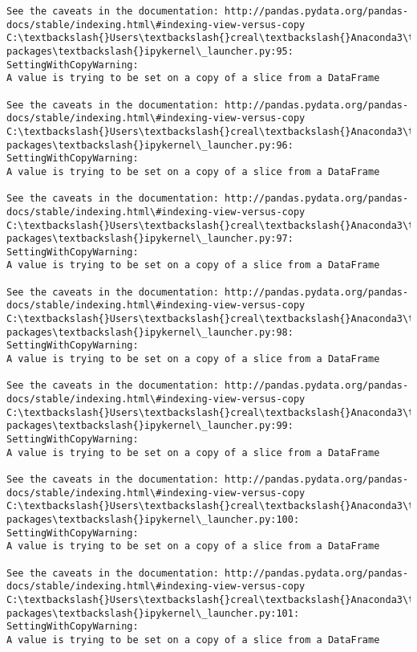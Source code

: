 \documentclass[11pt]{article}
\begin{document}
\begin{Verbatim}[commandchars=\\\{\}]
See the caveats in the documentation: http://pandas.pydata.org/pandas-docs/stable/indexing.html\#indexing-view-versus-copy
C:\textbackslash{}Users\textbackslash{}creal\textbackslash{}Anaconda3\textbackslash{}lib\textbackslash{}site-packages\textbackslash{}ipykernel\_launcher.py:95: SettingWithCopyWarning: 
A value is trying to be set on a copy of a slice from a DataFrame

See the caveats in the documentation: http://pandas.pydata.org/pandas-docs/stable/indexing.html\#indexing-view-versus-copy
C:\textbackslash{}Users\textbackslash{}creal\textbackslash{}Anaconda3\textbackslash{}lib\textbackslash{}site-packages\textbackslash{}ipykernel\_launcher.py:96: SettingWithCopyWarning: 
A value is trying to be set on a copy of a slice from a DataFrame

See the caveats in the documentation: http://pandas.pydata.org/pandas-docs/stable/indexing.html\#indexing-view-versus-copy
C:\textbackslash{}Users\textbackslash{}creal\textbackslash{}Anaconda3\textbackslash{}lib\textbackslash{}site-packages\textbackslash{}ipykernel\_launcher.py:97: SettingWithCopyWarning: 
A value is trying to be set on a copy of a slice from a DataFrame

See the caveats in the documentation: http://pandas.pydata.org/pandas-docs/stable/indexing.html\#indexing-view-versus-copy
C:\textbackslash{}Users\textbackslash{}creal\textbackslash{}Anaconda3\textbackslash{}lib\textbackslash{}site-packages\textbackslash{}ipykernel\_launcher.py:98: SettingWithCopyWarning: 
A value is trying to be set on a copy of a slice from a DataFrame

See the caveats in the documentation: http://pandas.pydata.org/pandas-docs/stable/indexing.html\#indexing-view-versus-copy
C:\textbackslash{}Users\textbackslash{}creal\textbackslash{}Anaconda3\textbackslash{}lib\textbackslash{}site-packages\textbackslash{}ipykernel\_launcher.py:99: SettingWithCopyWarning: 
A value is trying to be set on a copy of a slice from a DataFrame

See the caveats in the documentation: http://pandas.pydata.org/pandas-docs/stable/indexing.html\#indexing-view-versus-copy
C:\textbackslash{}Users\textbackslash{}creal\textbackslash{}Anaconda3\textbackslash{}lib\textbackslash{}site-packages\textbackslash{}ipykernel\_launcher.py:100: SettingWithCopyWarning: 
A value is trying to be set on a copy of a slice from a DataFrame

See the caveats in the documentation: http://pandas.pydata.org/pandas-docs/stable/indexing.html\#indexing-view-versus-copy
C:\textbackslash{}Users\textbackslash{}creal\textbackslash{}Anaconda3\textbackslash{}lib\textbackslash{}site-packages\textbackslash{}ipykernel\_launcher.py:101: SettingWithCopyWarning: 
A value is trying to be set on a copy of a slice from a DataFrame


\end{Verbatim}
\end{document}
